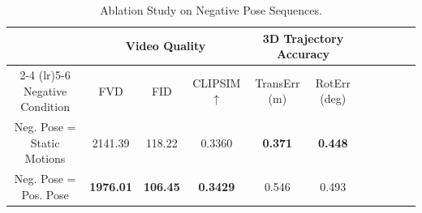 \begin{table}[!ht]

\caption{Ablation Study on Negative Pose Sequences.}
\label{tab:ablation_neg_pose}

\centering
\begin{threeparttable}
\resizebox{.92\textwidth}{!} 
{
\begin{tabular}{ccccccccccc}
\toprule
&  \multicolumn{3}{c}{ Video Quality } & \multicolumn{2}{c}{ 3D Trajectory Accuracy } \\
\cmidrule(lr){2-4} 
\cmidrule(lr){5-6} 
Negative Condition & FVD  & FID  & CLIPSIM $\uparrow$ & TransErr (m)  & RotErr (deg)  \\

\midrule
Neg. Pose = Static Motions  & 2141.39 & 118.22 & 0.3360 & \textbf{0.371} & \textbf{0.448} \\
Neg. Pose = Pos. Pose  & \textbf{1976.01} & \textbf{106.45} & \textbf{0.3429} & 0.546 & 0.493 \\
\bottomrule

\end{tabular}
}

\end{threeparttable}
\end{table}
